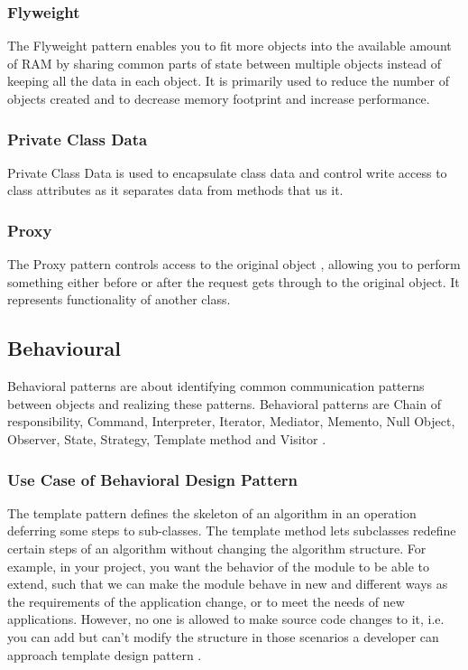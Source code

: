 \documentclass[sigplan,12pt,nonacm=true,review=false]{acmart}
\begin{document}
\subsubsection{Flyweight}
The Flyweight pattern enables you to fit more objects into the available amount of RAM by sharing common parts of state between multiple objects instead of keeping all the data in each object. It is primarily used to reduce the number of objects created and to decrease memory footprint and increase performance.

\subsubsection{Private Class Data}
Private Class Data is used to encapsulate class data and control write access to class attributes as it separates data from methods that us it. 

\subsubsection{Proxy}
The Proxy pattern controls access to the original object \cite{wendorff_assessment_2001}, allowing you to perform something either before or after the request gets through to the original object. It represents functionality of another class.

\subsection{Behavioural}
Behavioral patterns are about identifying common communication patterns between objects and realizing these patterns. Behavioral patterns are Chain of responsibility, Command, Interpreter, Iterator, Mediator, Memento, Null Object, Observer, State, Strategy, Template method and Visitor \cite{kuchana_software_2004, zimmer_relationships_1995}.

\subsubsection{Use Case of Behavioral Design Pattern}
The template pattern defines the skeleton of an algorithm in an operation deferring some steps to sub-classes. The template method lets subclasses redefine certain steps of an algorithm without changing the algorithm structure. For example, in your project, you want the behavior of the module to be able to extend, such that we can make the module behave in new and different ways as the requirements of the application change, or to meet the needs of new applications. However, no one is allowed to make source code changes to it, i.e. you can add but can’t modify the structure in those scenarios a developer can approach template design pattern \cite{noauthor_design_nodate, noauthor_design_2015}.
\end{document}
